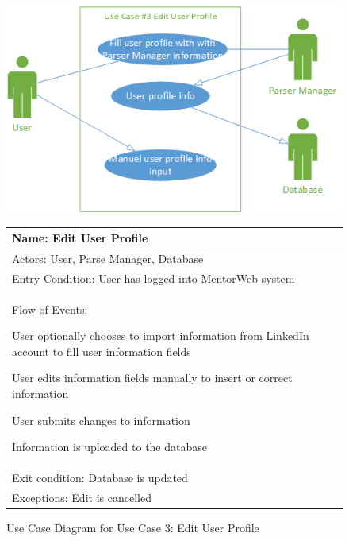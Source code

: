 \documentclass[11pt]{article}
\begin{document}
            \begin{figure}[H]
            \centering
            \includegraphics{UseCase3EditUserProfile}

				\begin{tabular}{|p{12 cm}|}
					\hline
					Name: Edit User Profile \\ \hline
					Actors: User, Parse Manager, Database \\ \hline
					Entry Condition: User has logged into MentorWeb system
					\\ \hline
					Flow of Events:
					\begin{enumerate*}
						\item User optionally chooses to import information from
						LinkedIn account to fill user information fields
						\item User edits information fields manually to insert
						or correct information
						\item User submits changes to information
						\item Information is uploaded to the database
					\end{enumerate*} \\ \hline
					Exit condition: Database is updated
					\\ \hline
					Exceptions: Edit is cancelled \\ \hline
				\end{tabular}

            \caption{Use Case Diagram for Use Case 3: Edit User Profile}
            \label{UC3}
            \end{figure}
\end{document}
